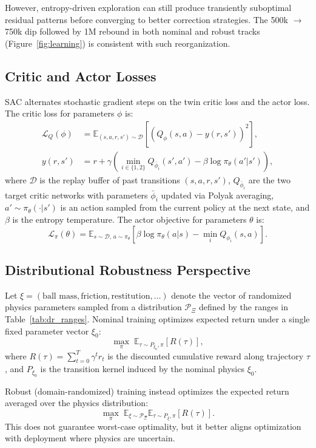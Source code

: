 \documentclass[10pt,twocolumn,letterpaper]{article}
\begin{document}
However, entropy-driven exploration can still produce transiently suboptimal residual patterns before converging to better correction strategies. The 500k $\rightarrow$ 750k dip followed by 1M rebound in both nominal and robust tracks (Figure~\ref{fig:learning}) is consistent with such reorganization.

\subsection{Critic and Actor Losses}
SAC alternates stochastic gradient steps on the twin critic loss and the actor loss. The critic loss for parameters $\phi$ is:
\begin{align*}
\mathcal{L}_Q(\phi) &=
\mathbb{E}_{(s,a,r,s')\sim\mathcal{D}}
\left[\left(Q_\phi(s,a)-y(r,s')\right)^2\right],\\
y(r,s') &= r + \gamma\left(
\min_{i\in\{1,2\}}Q_{\bar\phi_i}(s',a')
 - \beta\log\pi_\theta(a'|s')
\right),
\end{align*}
where $\mathcal{D}$ is the replay buffer of past transitions $(s,a,r,s')$, $Q_{\bar\phi_i}$ are the two target critic networks with parameters $\bar\phi_i$ updated via Polyak averaging, $a'\sim\pi_\theta(\cdot|s')$ is an action sampled from the current policy at the next state, and $\beta$ is the entropy temperature. The actor objective for parameters $\theta$ is:
\[
\mathcal{L}_\pi(\theta)=
\mathbb{E}_{s\sim\mathcal{D},\,a\sim\pi_\theta}
\left[\beta\log\pi_\theta(a|s)-\min_i Q_{\phi_i}(s,a)\right].
\]

\subsection{Distributional Robustness Perspective}
Let $\xi = (\text{ball mass}, \text{friction}, \text{restitution}, \ldots)$ denote the vector of randomized physics parameters sampled from a distribution $\mathcal{P}_\Xi$ defined by the ranges in Table~\ref{tab:dr_ranges}. Nominal training optimizes expected return under a single fixed parameter vector $\xi_0$:
\[
\max_\pi \; \mathbb{E}_{\tau\sim P_{\xi_0},\pi}\!\left[R(\tau)\right],
\]
where $R(\tau) = \sum_{t=0}^{T} \gamma^t r_t$ is the discounted cumulative reward along trajectory $\tau$, and $P_{\xi_0}$ is the transition kernel induced by the nominal physics $\xi_0$.

Robust (domain-randomized) training instead optimizes the expected return averaged over the physics distribution:
\[
\max_\pi \; \mathbb{E}_{\xi\sim\mathcal{P}_\Xi}\mathbb{E}_{\tau\sim P_{\xi},\pi}\!\left[R(\tau)\right].
\]
This does not guarantee worst-case optimality, but it better aligns optimization with deployment where physics are uncertain.
\end{document}
